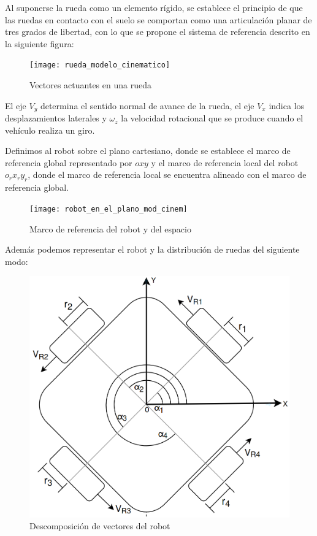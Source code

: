 Al suponerse la rueda como un elemento rígido, se establece el principio de que las ruedas en contacto con el suelo se comportan como una articulación planar de tres grados de libertad, con lo que se propone el sistema de referencia descrito en la siguiente figura:

\begin{figure}[H]
    \centering
    \texttt{[image: rueda\_modelo\_cinematico]}
    \caption{Vectores actuantes en una rueda}
    \label{fig:vectoresrueda}
\end{figure}

El eje $V_y$ determina el sentido normal de avance de la rueda, el eje $V_x$ indica los desplazamientos laterales y $\omega_z$ la velocidad rotacional que se produce cuando el vehículo realiza un giro.

Definimos al robot sobre el plano cartesiano, donde se establece el marco de referencia global representado por $oxy$ y el marco de referencia local del robot $o_rx_ry_r$, donde el marco de referencia local se encuentra alineado con el marco de referencia global.

\begin{figure}[H]
    \centering
    \texttt{[image: robot\_en\_el\_plano\_mod\_cinem]}
    \caption{Marco de referencia del robot y del espacio}
    \label{fig:marcorefrobotenelplano}
\end{figure}

Además podemos representar el robot y la distribución de ruedas del siguiente modo:

\begin{figure}[H]
    \centering
    \includegraphics[width=0.6\linewidth]{images/modelo_cinematico_robot_ruedas.png}
    \caption{Descomposición de vectores del robot}
    \label{fig:vectoresrobotmodelocinem}
\end{figure}

